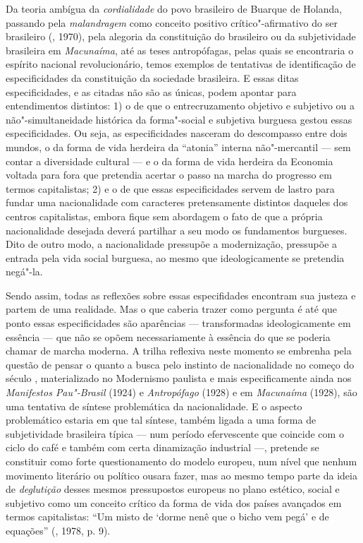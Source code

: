 Da teoria ambígua da \emph{cordialidade} do povo brasileiro de Buarque
de Holanda, passando pela \emph{malandragem} como conceito positivo
crítico"-afirmativo do ser brasileiro (, 1970), pela alegoria da
constituição do brasileiro ou da subjetividade brasileira em
\emph{Macunaíma}, até as teses antropófagas, pelas quais se encontraria
o espírito nacional revolucionário, temos exemplos de tentativas de
identificação de especificidades da constituição da sociedade
brasileira. E essas ditas especificidades, e as citadas não são as
únicas, podem apontar para entendimentos distintos: 1) o de que o
entrecruzamento objetivo e subjetivo ou a não"-simultaneidade histórica
da forma"-social e subjetiva burguesa gestou essas especificidades. Ou
seja, as especificidades nasceram do descompasso entre dois
mundos, o da forma de vida herdeira da ``atonia'' interna não"-mercantil
--- sem contar a diversidade cultural --- e o da forma de vida herdeira da
Economia voltada para fora que pretendia acertar o passo na marcha do
progresso em termos capitalistas; 2) e o de que essas especificidades servem de
lastro para fundar uma nacionalidade com caracteres pretensamente
distintos daqueles dos centros capitalistas, embora fique sem abordagem
o fato de que a própria nacionalidade desejada deverá partilhar a seu
modo os fundamentos burgueses. Dito de outro modo, a nacionalidade
pressupõe a modernização, pressupõe a entrada pela vida social burguesa,
ao mesmo que ideologicamente se pretendia negá"-la.

Sendo assim, todas as reflexões sobre essas especifidades
encontram sua justeza e partem de uma
realidade. Mas o que caberia trazer como pergunta é até que ponto essas
especificidades são aparências --- transformadas ideologicamente em
essência --- que não se opõem necessariamente à essência do que se
poderia chamar de marcha moderna. A trilha reflexiva neste momento
se embrenha pela questão de pensar o quanto a busca pelo
instinto de nacionalidade no começo do século , materializado no
Modernismo paulista e mais especificamente ainda nos \emph{Manifestos
Pau"-Brasil} (1924) e \emph{Antropófago} (1928) e em \emph{Macunaíma}
(1928), são uma tentativa de síntese problemática da nacionalidade. E o
aspecto problemático estaria em que tal síntese, também ligada a uma
forma de subjetividade brasileira típica --- num período efervescente que
coincide com o ciclo do café e também com certa dinamização industrial
---, pretende se constituir como forte questionamento do modelo europeu,
num nível que nenhum movimento literário ou político ousara fazer, mas
ao mesmo tempo parte da ideia de \emph{deglutição} desses mesmos
pressupostos europeus no plano estético, social e subjetivo como um
conceito crítico da forma de vida dos países avançados em termos
capitalistas: ``Um misto de `dorme nenê que o bicho vem pegá' e de
equações'' (, 1978, p. 9).

